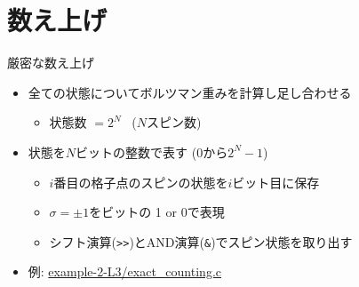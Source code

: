 \documentclass[dvipdfmx]{beamer}
\begin{document}
\section{数え上げ}

\begin{frame}[t,fragile]{厳密な数え上げ}
  \begin{itemize}
    \setlength{\itemsep}{1em}
  \item 全ての状態についてボルツマン重みを計算し足し合わせる
    \begin{itemize}
    \item 状態数 $= 2^N$ \ ($N$スピン数)
    \end{itemize}
  \item 状態を$N$ビットの整数で表す (0から$2^N-1$)
    \begin{itemize}
    \item $i$番目の格子点のスピンの状態を$i$ビット目に保存
    \item $\sigma = \pm 1$をビットの 1 or 0で表現
    \item シフト演算(\verb+>>+)とAND演算(\verb+&+)でスピン状態を取り出す
    \end{itemize}
  \item 例: \href{https://github.com/todo-group/computer-experiments/blob/master/exercise/monte_carlo/exact_counting.c}{example-2-L3/exact\_counting.c}
  \end{itemize}
\end{frame}
\end{document}
